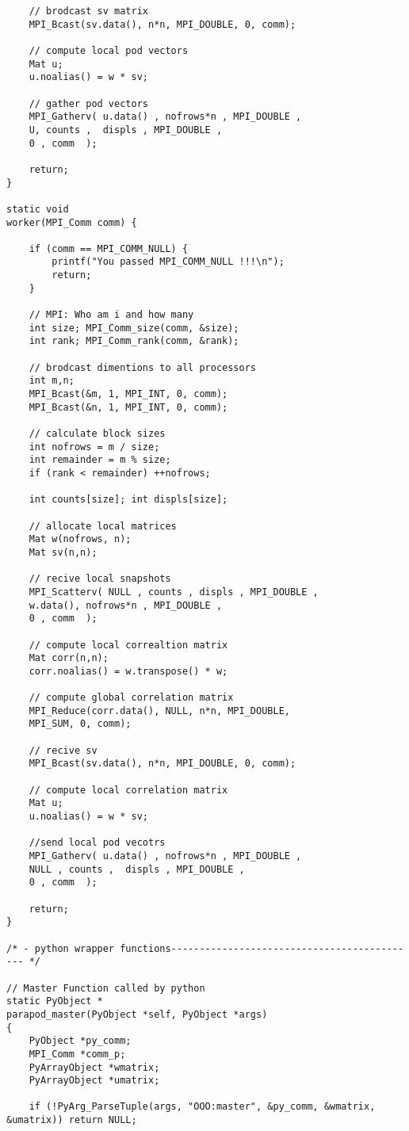 \begin{lstlisting}
	// brodcast sv matrix
	MPI_Bcast(sv.data(), n*n, MPI_DOUBLE, 0, comm);
	
	// compute local pod vectors
	Mat u; 
	u.noalias() = w * sv; 
	
	// gather pod vectors
	MPI_Gatherv( u.data() , nofrows*n , MPI_DOUBLE , 
	U, counts ,  displs , MPI_DOUBLE ,
	0 , comm  );
	
	return;
}

static void
worker(MPI_Comm comm) {
	
	if (comm == MPI_COMM_NULL) {
		printf("You passed MPI_COMM_NULL !!!\n");
		return;
	}
	
	// MPI: Who am i and how many
	int size; MPI_Comm_size(comm, &size);
	int rank; MPI_Comm_rank(comm, &rank);
	
	// brodcast dimentions to all processors
	int m,n;	
	MPI_Bcast(&m, 1, MPI_INT, 0, comm);
	MPI_Bcast(&n, 1, MPI_INT, 0, comm);
	
	// calculate block sizes
	int nofrows = m / size;
	int remainder = m % size;
	if (rank < remainder) ++nofrows;
	
	int counts[size]; int displs[size];
	
	// allocate local matrices
	Mat w(nofrows, n);
	Mat sv(n,n);
	
	// recive local snapshots
	MPI_Scatterv( NULL , counts , displs , MPI_DOUBLE ,
	w.data(), nofrows*n , MPI_DOUBLE ,
	0 , comm  );
	
	// compute local correaltion matrix
	Mat corr(n,n);
	corr.noalias() = w.transpose() * w; 
	
	// compute global correlation matrix	
	MPI_Reduce(corr.data(), NULL, n*n, MPI_DOUBLE,
	MPI_SUM, 0, comm);
	
	// recive sv
	MPI_Bcast(sv.data(), n*n, MPI_DOUBLE, 0, comm);
	
	// compute local correlation matrix
	Mat u; 
	u.noalias() = w * sv; 
	
	//send local pod vecotrs
	MPI_Gatherv( u.data() , nofrows*n , MPI_DOUBLE , 
	NULL , counts ,  displs , MPI_DOUBLE ,
	0 , comm  );
	
	return;
}

/* - python wrapper functions-------------------------------------------- */

// Master Function called by python
static PyObject *
parapod_master(PyObject *self, PyObject *args)
{
	PyObject *py_comm;
	MPI_Comm *comm_p;
	PyArrayObject *wmatrix;
	PyArrayObject *umatrix;
	
	if (!PyArg_ParseTuple(args, "OOO:master", &py_comm, &wmatrix, &umatrix)) return NULL;
	

\end{lstlisting}

